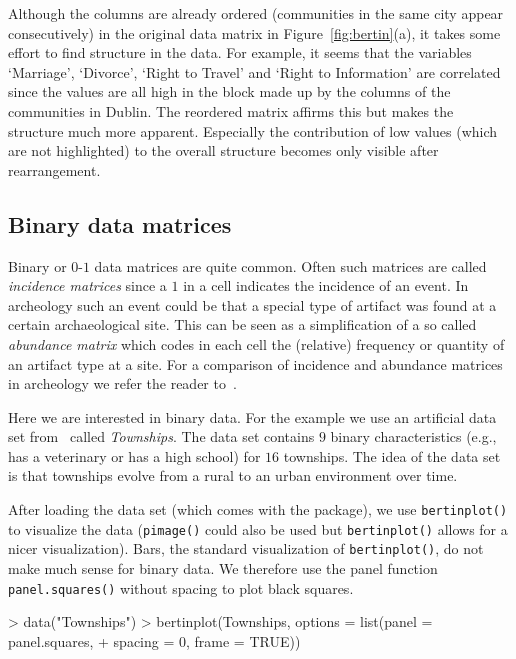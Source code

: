 \documentclass[fleqn, a4paper]{article}
\newcommand{\func}[1]{\mbox{\texttt{#1()}}}
\begin{document}
Although the columns are already ordered (communities in the same city appear
consecutively) in the original data matrix in Figure~\ref{fig:bertin}(a), it
takes some effort to find structure in the data.  For example, it seems that
the variables `Marriage', `Divorce', `Right to Travel' and `Right to
Information' are correlated since the values are all high in the block made up
by the columns of the communities in Dublin.  The reordered matrix affirms this
but makes the structure much more apparent. Especially the contribution of low
values (which are not highlighted) to the overall structure becomes only
visible after rearrangement.

\subsection{Binary data matrices}

Binary or $0$-$1$ data matrices are quite common.  Often such matrices are
called \emph{incidence matrices} since a $1$ in a cell indicates the incidence
of an event. In archeology such an event could be that a special type of
artifact was found at a certain archaeological site.
This can be seen as a simplification of a so called \emph{abundance matrix}
which codes in each cell the (relative) frequency or quantity of an artifact
type at a site. For a comparison of incidence and abundance matrices
in archeology we refer the reader to~\cite{seriation:Ihm:2005}. 

Here we are interested in binary data.
For the example we use an artificial data set from~\cite{seriation:Bertin:1981}
called \emph{Townships}.  The data set contains $9$ binary characteristics
(e.g., has a veterinary or has a high school) for $16$ townships. The idea of
the data set is that townships evolve from a rural to an urban environment over
time.

After loading the data set (which comes with the package), we use
\func{bertinplot} to visualize the data (\func{pimage} could also be used
but \func{bertinplot} allows for a nicer visualization).
Bars, the standard visualization of \func{bertinplot}, do not
make much sense for binary data. We therefore use the 
panel function \func{panel.squares} without spacing 
to plot black squares.

\begin{Schunk}
\begin{Sinput}
> data("Townships")
> bertinplot(Townships, options = list(panel = panel.squares, 
+     spacing = 0, frame = TRUE))
\end{Sinput}
\end{Schunk}
\end{document}

